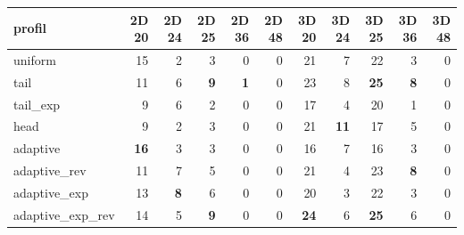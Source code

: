 \begin{tabular}{lrrrrrrrrrr}
\hline
profil & 2D 20 & 2D 24 & 2D 25 & 2D 36 & 2D 48 & 3D 20 & 3D 24 & 3D 25 & 3D 36 & 3D 48 \\
\hline
uniform & 15 & 2 & 3 & 0 & 0 & 21 & 7 & 22 & 3 & 0 \\
tail & 11 & 6 & \textbf{9} & \textbf{1} & 0 & 23 & 8 & \textbf{25} & \textbf{8} & 0 \\
tail\_exp & 9 & 6 & 2 & 0 & 0 & 17 & 4 & 20 & 1 & 0 \\
head & 9 & 2 & 3 & 0 & 0 & 21 & \textbf{11} & 17 & 5 & 0 \\
adaptive & \textbf{16} & 3 & 3 & 0 & 0 & 16 & 7 & 16 & 3 & 0 \\
adaptive\_rev & 11 & 7 & 5 & 0 & 0 & 21 & 4 & 23 & \textbf{8} & 0 \\
adaptive\_exp & 13 & \textbf{8} & 6 & 0 & 0 & 20 & 3 & 22 & 3 & 0 \\
adaptive\_exp\_rev & 14 & 5 & \textbf{9} & 0 & 0 & \textbf{24} & 6 & \textbf{25} & 6 & 0 \\
\hline
\end{tabular}
